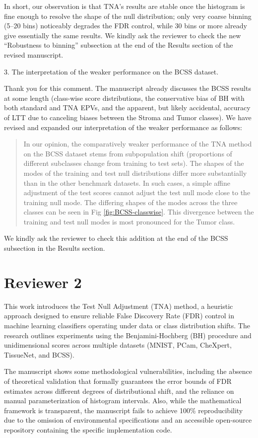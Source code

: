 \documentclass{article}
\newcommand{\response}[1]{\vspace*{1ex} \color{blue} \noindent #1 \color{black}
\vspace*{2ex}}
\newcommand{\edit}[1]{\begin{quotation}\color{red}\noindent #1
\color{black}\end{quotation}}
\begin{document}
\response{In short, our observation is that TNA's results are stable once the histogram is fine enough to resolve the shape of the null distribution; only very coarse binning (5--20 bins) noticeably degrades the FDR control, while 30 bins or more already give essentially the same results. We kindly ask the reviewer to check the new ``Robustness to binning'' subsection at the end of the Results section of the revised manuscript.}

3. The interpretation of the weaker performance on the BCSS dataset.

\response{Thank you for this comment. The manuscript already discusses the BCSS results at some length (class-wise score distributions, the conservative bias of BH with both standard and TNA EPVs, and the apparent, but likely accidental, accuracy of LTT due to canceling biases between the Stroma and Tumor classes). We have revised and expanded our interpretation of the weaker performance as follows:}

\edit{In our opinion, the comparatively weaker performance of the TNA method on the BCSS dataset stems from subpopulation shift (proportions of different subclasses change from training to test sets). The shapes of the modes of the training and test null distributions differ more substantially than in the other benchmark datasets. In such cases, a simple affine adjustment of the test scores cannot adjust the test null mode close to the training null mode. The differing shapes of the modes across the three classes can be seen in Fig \ref{fig:BCSS-classwise}. This divergence between the training and test null modes is most pronounced for the Tumor class.}

\response{We kindly ask the reviewer to check this addition at the end of the BCSS subsection in the Results section.}

\clearpage
\section*{Reviewer 2}

This work introduces the Test Null Adjustment (TNA) method, a heuristic approach designed to ensure reliable False Discovery Rate (FDR) control in machine learning classifiers operating under data or class distribution shifts. The research outlines experiments using the Benjamini-Hochberg (BH) procedure and unidimensional scores across multiple datasets (MNIST, PCam, CheXpert, TissueNet, and BCSS).

The manuscript shows some methodological vulnerabilities, including the absence of theoretical validation that formally guarantees the error bounds of FDR estimates across different degrees of distributional shift, and the reliance on manual parameterization of histogram intervals. Also, while the mathematical framework is transparent, the manuscript fails to achieve 100\% reproducibility due to the omission of environmental specifications and an accessible open-source repository containing the specific implementation code.
\end{document}
